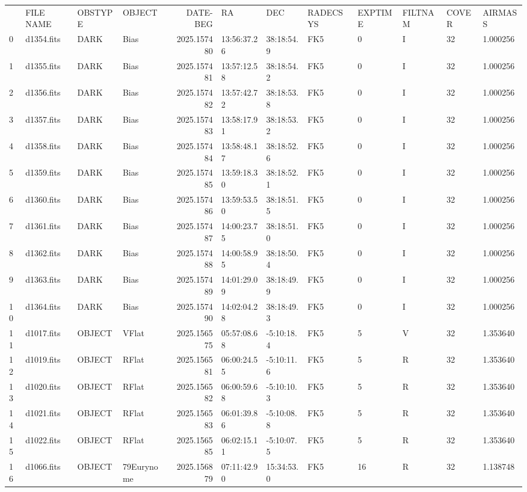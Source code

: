 \begin{tabular}{llllrlllllll}
 & FILE NAME & OBSTYPE & OBJECT & DATE-BEG & RA & DEC & RADECSYS & EXPTIME & FILTNAM & COVER & AIRMASS \\
0 & d1354.fits & DARK & Bias & 2025.157480 & 13:56:37.26 & 38:18:54.9 & FK5 & 0 & I & 32 & 1.000256 \\
1 & d1355.fits & DARK & Bias & 2025.157481 & 13:57:12.58 & 38:18:54.2 & FK5 & 0 & I & 32 & 1.000256 \\
2 & d1356.fits & DARK & Bias & 2025.157482 & 13:57:42.72 & 38:18:53.8 & FK5 & 0 & I & 32 & 1.000256 \\
3 & d1357.fits & DARK & Bias & 2025.157483 & 13:58:17.91 & 38:18:53.2 & FK5 & 0 & I & 32 & 1.000256 \\
4 & d1358.fits & DARK & Bias & 2025.157484 & 13:58:48.17 & 38:18:52.6 & FK5 & 0 & I & 32 & 1.000256 \\
5 & d1359.fits & DARK & Bias & 2025.157485 & 13:59:18.30 & 38:18:52.1 & FK5 & 0 & I & 32 & 1.000256 \\
6 & d1360.fits & DARK & Bias & 2025.157486 & 13:59:53.50 & 38:18:51.5 & FK5 & 0 & I & 32 & 1.000256 \\
7 & d1361.fits & DARK & Bias & 2025.157487 & 14:00:23.75 & 38:18:51.0 & FK5 & 0 & I & 32 & 1.000256 \\
8 & d1362.fits & DARK & Bias & 2025.157488 & 14:00:58.95 & 38:18:50.4 & FK5 & 0 & I & 32 & 1.000256 \\
9 & d1363.fits & DARK & Bias & 2025.157489 & 14:01:29.09 & 38:18:49.9 & FK5 & 0 & I & 32 & 1.000256 \\
10 & d1364.fits & DARK & Bias & 2025.157490 & 14:02:04.28 & 38:18:49.3 & FK5 & 0 & I & 32 & 1.000256 \\
11 & d1017.fits & OBJECT & VFlat & 2025.156575 & 05:57:08.68 & -5:10:18.4 & FK5 & 5 & V & 32 & 1.353640 \\
12 & d1019.fits & OBJECT & RFlat & 2025.156581 & 06:00:24.55 & -5:10:11.6 & FK5 & 5 & R & 32 & 1.353640 \\
13 & d1020.fits & OBJECT & RFlat & 2025.156582 & 06:00:59.68 & -5:10:10.3 & FK5 & 5 & R & 32 & 1.353640 \\
14 & d1021.fits & OBJECT & RFlat & 2025.156583 & 06:01:39.86 & -5:10:08.8 & FK5 & 5 & R & 32 & 1.353640 \\
15 & d1022.fits & OBJECT & RFlat & 2025.156585 & 06:02:15.11 & -5:10:07.5 & FK5 & 5 & R & 32 & 1.353640 \\
16 & d1066.fits & OBJECT & 79Eurynome & 2025.156879 & 07:11:42.90 & 15:34:53.0 & FK5 & 16 & R & 32 & 1.138748 \\

\end{tabular}
